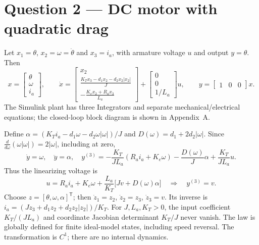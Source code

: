 \section*{Question 2 --- DC motor with quadratic drag}
Let $x_1=\theta$, $x_2=\omega=\dot\theta$ and $x_3=i_a$, with armature voltage $u$ and output $y=\theta$. Then
\begin{equation}
x=\begin{bmatrix}\theta\\\omega\\i_a\end{bmatrix},\qquad
\boxed{\dot x=
\begin{bmatrix}x_2\\\frac{K_Tx_3-d_1x_2-d_2x_2|x_2|}{J}\\-\frac{K_ex_2+R_ax_3}{L_a}\end{bmatrix}
+\begin{bmatrix}0\\0\\1/L_a\end{bmatrix}u},\qquad
y=\begin{bmatrix}1&0&0\end{bmatrix}x.
\end{equation}
The Simulink plant has three Integrators and separate mechanical/electrical equations; the closed-loop block diagram is shown in Appendix~A.

Define $\alpha=(K_Ti_a-d_1\omega-d_2\omega|\omega|)/J$ and $D(\omega)=d_1+2d_2|\omega|$. Since $\frac{d}{d\omega}(\omega|\omega|)=2|\omega|$, including at zero,
\begin{equation}
\dot y=\omega,\quad\ddot y=\alpha,\quad
y^{(3)}=-\frac{K_T}{JL_a}(R_ai_a+K_e\omega)-\frac{D(\omega)}{J}\alpha+\frac{K_T}{JL_a}u.
\end{equation}
Thus the linearizing voltage is
\begin{equation}
\boxed{u=R_ai_a+K_e\omega+\frac{L_a}{K_T}\bigl[Jv+D(\omega)\alpha\bigr]}
\quad\Longrightarrow\quad y^{(3)}=v.
\end{equation}
Choose $z=[\theta,\omega,\alpha]^\mathsf{T}$; then $\dot z_1=z_2$, $\dot z_2=z_3$, $\dot z_3=v$. Its inverse is $i_a=(Jz_3+d_1z_2+d_2z_2|z_2|)/K_T$. For $J,L_a,K_T>0$, the input coefficient $K_T/(JL_a)$ and coordinate Jacobian determinant $K_T/J$ never vanish. The law is globally defined for finite ideal-model states, including speed reversal. The transformation is $C^1$; there are no internal dynamics.

